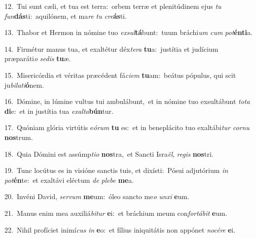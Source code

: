 {\numbfont\textcolor{\numbcolor}{12.}}~Tui sunt cæli, et tua est terra:~\dagger orbem terræ et plenitúdinem ejus \textit{tu} \textit{fun}\-\textbf{dás}ti:~\star aquilónem, et ma\textit{re} \textit{tu} \textit{cre}\-\textbf{ás}ti.\par
{\numbfont\textcolor{\numbcolor}{13.}}~Thabor et Hermon in nómine tuo \textit{ex}\-\textit{sul}\textbf{tá}bunt:~\star tuum bráchi\textit{um} \textit{cum} \textit{pot}\-\textbf{én}\textbf{ti}a.\par
{\numbfont\textcolor{\numbcolor}{14.}}~Firmétur manus tua, et exaltétur déx\-\textit{te}\-\textit{ra} \textbf{tu}\-a:~\star justítia et judícium præparáti\textit{o} \textit{se}\-\textit{dis} \textbf{tu}\-æ.\par
{\numbfont\textcolor{\numbcolor}{15.}}~Misericórdia et véritas præcédent fá\-\textit{ci}\-\textit{em} \textbf{tu}\-am:~\star beátus pópulus, qui scit ju\-\textit{bi}\-\textit{la}\textit{ti}\textbf{ó}nem.\par
{\numbfont\textcolor{\numbcolor}{16.}}~Dómine, in lúmine vultus tui ambulábunt,~\dagger et in nómine tuo exsultábunt \textit{to}\-\textit{ta} \textbf{di}\-e:~\star et in justítia tua \textit{ex}\-\textit{al}\textit{ta}\textbf{bún}tur.\par
{\numbfont\textcolor{\numbcolor}{17.}}~Quóniam glória virtútis e\-\textit{ó}\-\textit{rum} \textbf{tu} es:~\star et in beneplácito tuo exaltábi\textit{tur} \textit{cor}\-\textit{nu} \textbf{nos}\-trum.\par
{\numbfont\textcolor{\numbcolor}{18.}}~Quia Dómini est assúmp\-\textit{ti}\-\textit{o} \textbf{nos}\-tra,~\star et Sancti Isra\-\textit{ël}\-, \textit{re}\-\textit{gis} \textbf{nos}\-tri.\par
{\numbfont\textcolor{\numbcolor}{19.}}~Tunc locútus es in visióne sanctis tuis, et dixísti:~\dagger Pósui adjutórium \textit{in} \textit{pot}\-\textbf{én}te:~\star et exaltávi eléctum \textit{de} \textit{ple}\-\textit{be} \textbf{me}\-a.\par
{\numbfont\textcolor{\numbcolor}{20.}}~Invéni David, \textit{ser}\-\textit{vum} \textbf{me}\-um:~\star óleo sancto me\textit{o} \textit{un}\-\textit{xi} \textbf{e}\-um.\par
{\numbfont\textcolor{\numbcolor}{21.}}~Manus enim mea auxiliá\-\textit{bi}\-\textit{tur} \textbf{e}\-i:~\star et bráchium meum con\-\textit{for}\-\textit{tá}\textit{bit} \textbf{e}\-um.\par
{\numbfont\textcolor{\numbcolor}{22.}}~Nihil profíciet inimí\textit{cus} \textit{in} \textbf{e}\-o:~\star et fílius iniquitátis non appónet \textit{no}\-\textit{cé}\textit{re} \textbf{e}\-i.\par

